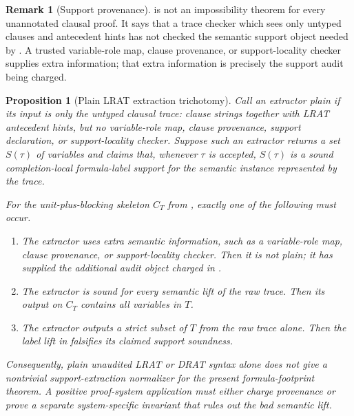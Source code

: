 \documentclass[11pt]{article}
\newtheorem{proposition}[theorem]{Proposition}
\theoremstyle{definition}
\newtheorem{remark}[theorem]{Remark}
\begin{document}
\begin{remark}[Support provenance]\label{rem:support-erasure-scope}
 is not an impossibility theorem for every unannotated clausal proof.  It says that a trace checker which sees only untyped clauses and antecedent hints has not checked the semantic support object needed by .  A trusted variable-role map, clause provenance, or support-locality checker supplies extra information; that extra information is precisely the support audit being charged.
\end{remark}

\begin{proposition}[Plain LRAT extraction trichotomy]\label{prop:plain-lrat-extraction-trichotomy}
Call an extractor \emph{plain} if its input is only the untyped clausal trace: clause strings together with LRAT antecedent hints, but no variable-role map, clause provenance, support declaration, or support-locality checker.  Suppose such an extractor returns a set \(S(\tau)\) of variables and claims that, whenever \(\tau\) is accepted, \(S(\tau)\) is a sound completion-local formula-label support for the semantic instance represented by the trace.

For the unit-plus-blocking skeleton \(C_T\) from , exactly one of the following must occur.
\begin{enumerate}
  \item The extractor uses extra semantic information, such as a variable-role map, clause provenance, or support-locality checker.  Then it is not plain; it has supplied the additional audit object charged in .
  \item The extractor is sound for every semantic lift of the raw trace.  Then its output on \(C_T\) contains all variables in \(T\).
  \item The extractor outputs a strict subset of \(T\) from the raw trace alone.  Then the label lift in  falsifies its claimed support soundness.
\end{enumerate}
Consequently, plain unaudited LRAT or DRAT syntax alone does not give a nontrivial support-extraction normalizer for the present formula-footprint theorem.  A positive proof-system application must either charge provenance or prove a separate system-specific invariant that rules out the bad semantic lift.
\end{proposition}
\end{document}
